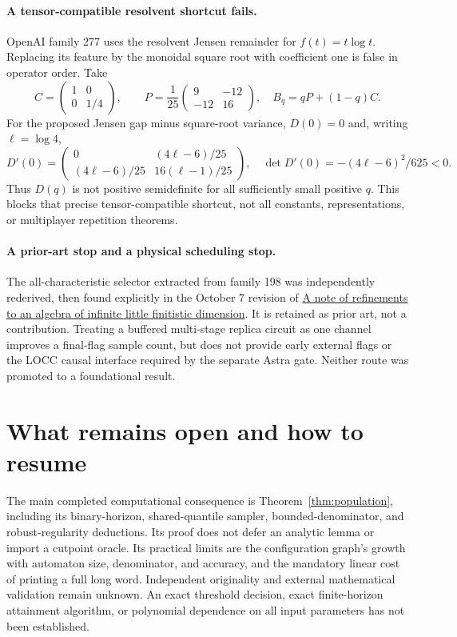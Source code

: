 \documentclass[11pt]{article}
\begin{document}
\paragraph{A tensor-compatible resolvent shortcut fails.}
OpenAI family 277 uses the resolvent Jensen remainder for $f(t)=t\log t$. Replacing its feature by the monoidal square root with coefficient one is false in operator order. Take
\[
C=\begin{pmatrix}1&0\\0&1/4\end{pmatrix},\qquad
P=\frac1{25}\begin{pmatrix}9&-12\\-12&16\end{pmatrix},\quad B_q=qP+(1-q)C.
\]
For the proposed Jensen gap minus square-root variance, $D(0)=0$ and, writing $\ell=\log4$,
\[
D'(0)=\begin{pmatrix}0&(4\ell-6)/25\\(4\ell-6)/25&16(\ell-1)/25\end{pmatrix},
\quad\det D'(0)=-(4\ell-6)^2/625<0.
\]
Thus $D(q)$ is not positive semidefinite for all sufficiently small positive $q$. This blocks that precise tensor-compatible shortcut, not all constants, representations, or multiplayer repetition theorems.

\paragraph{A prior-art stop and a physical scheduling stop.}
The all-characteristic selector extracted from family 198 was independently rederived, then found explicitly in the October 7 revision of \href{https://hexagonmath.org/2610.00140v1}{A note of refinements to an algebra of infinite little finitistic dimension}. It is retained as prior art, not a contribution. Treating a buffered multi-stage replica circuit as one channel improves a final-flag sample count, but does not provide early external flags or the LOCC causal interface required by the separate Astra gate. Neither route was promoted to a foundational result.

\section{What remains open and how to resume}

The main completed computational consequence is Theorem~\ref{thm:population}, including its binary-horizon, shared-quantile sampler, bounded-denominator, and robust-regularity deductions. Its proof does not defer an analytic lemma or import a cutpoint oracle. Its practical limits are the configuration graph's growth with automaton size, denominator, and accuracy, and the mandatory linear cost of printing a full long word. Independent originality and external mathematical validation remain unknown. An exact threshold decision, exact finite-horizon attainment algorithm, or polynomial dependence on all input parameters has not been established.
\end{document}

